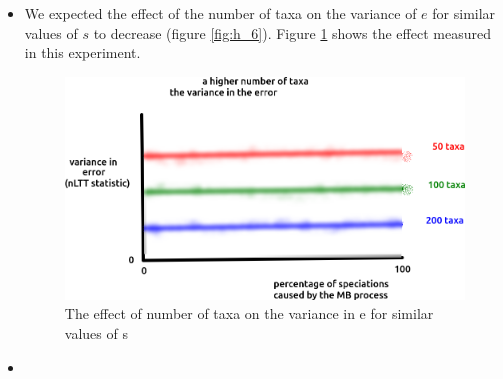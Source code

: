 \documentclass{article}
\begin{document}
\begin{itemize}
\item We expected the effect of the number of taxa on the variance
of $e$ for similar values of $s$ to decrease (figure \ref{fig:h_6}). 
Figure \ref{fig:6} shows the effect 
measured in this experiment. 

\begin{figure}[!htbp]
  \includegraphics[width=\textwidth]{fig_6.png}
  \caption{
    The effect of number of taxa on the variance in e
    for similar values of s
  }
  \label{fig:6}
\end{figure}


\item

\end{itemize}




\appendix
\end{document}
